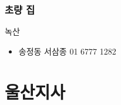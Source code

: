 \documentclass[aspectratio=1610,20pt,xcolor=pdftex,dvipsnames,table,handout]{beamer}
\begin{document}
		\begin{frame} [t,plain]
		\frametitle{초량 집}
			\begin{block} {녹산}
			\setlength{\leftmargini}{1em}			
			\begin{itemize}
				\item 송정동 서삼종 01  6777 1282 

			\end{itemize}
			\end{block}			

		\end{frame}						


		\begin{frame} [t,plain]
		\end{frame}						


		\section{울산지사 }
\end{document}
